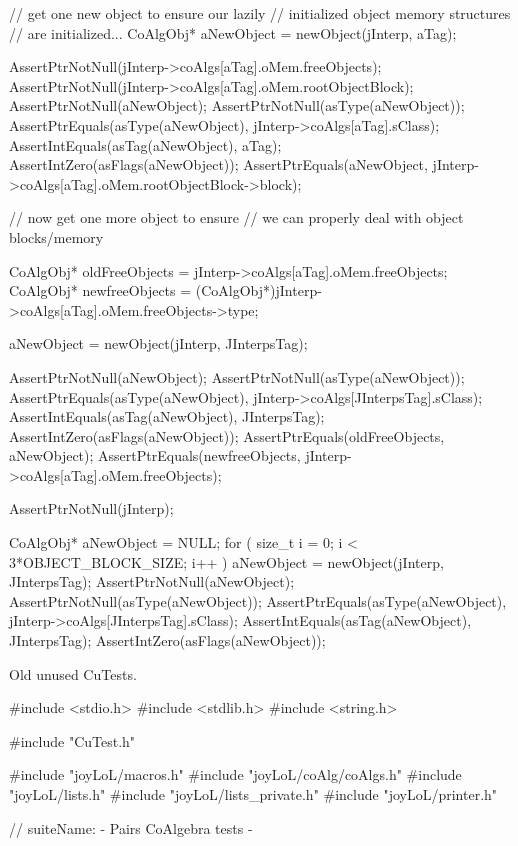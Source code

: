   // get one new object to ensure our lazily
  // initialized object memory structures 
  // are initialized...
  CoAlgObj* aNewObject = newObject(jInterp, aTag);
  
  AssertPtrNotNull(jInterp->coAlgs[aTag].oMem.freeObjects);
  AssertPtrNotNull(jInterp->coAlgs[aTag].oMem.rootObjectBlock);
  AssertPtrNotNull(aNewObject);
  AssertPtrNotNull(asType(aNewObject));
  AssertPtrEquals(asType(aNewObject), jInterp->coAlgs[aTag].sClass);
  AssertIntEquals(asTag(aNewObject), aTag);
  AssertIntZero(asFlags(aNewObject));
  AssertPtrEquals(aNewObject,
    jInterp->coAlgs[aTag].oMem.rootObjectBlock->block);

  // now get one more object to ensure
  // we can properly deal with object blocks/memory
  
  CoAlgObj* oldFreeObjects =
    jInterp->coAlgs[aTag].oMem.freeObjects;
  CoAlgObj* newfreeObjects = 
    (CoAlgObj*)jInterp->coAlgs[aTag].oMem.freeObjects->type;

  aNewObject = newObject(jInterp, JInterpsTag);

  AssertPtrNotNull(aNewObject);
  AssertPtrNotNull(asType(aNewObject));
  AssertPtrEquals(asType(aNewObject), jInterp->coAlgs[JInterpsTag].sClass);
  AssertIntEquals(asTag(aNewObject), JInterpsTag);
  AssertIntZero(asFlags(aNewObject));
  AssertPtrEquals(oldFreeObjects, aNewObject);
  AssertPtrEquals(newfreeObjects, jInterp->coAlgs[aTag].oMem.freeObjects);
\stopCTest
\stopTestCase


\startCTest
  AssertPtrNotNull(jInterp);

  CoAlgObj* aNewObject = NULL;
  for ( size_t i = 0; i < 3*OBJECT_BLOCK_SIZE; i++ ) {
    aNewObject = newObject(jInterp, JInterpsTag);
  }
  AssertPtrNotNull(aNewObject);
  AssertPtrNotNull(asType(aNewObject));
  AssertPtrEquals(asType(aNewObject), jInterp->coAlgs[JInterpsTag].sClass);
  AssertIntEquals(asTag(aNewObject), JInterpsTag);
  AssertIntZero(asFlags(aNewObject));
\stopCTest
\stopTestCase
\stopTestSuite

Old unused CuTests.

\starttyping
#include <stdio.h>
#include <stdlib.h>
#include <string.h>

#include "CuTest.h"

#include "joyLoL/macros.h"
#include "joyLoL/coAlg/coAlgs.h"
#include "joyLoL/lists.h"
#include "joyLoL/lists_private.h"
#include "joyLoL/printer.h"

// suiteName: - Pairs CoAlgebra tests -


